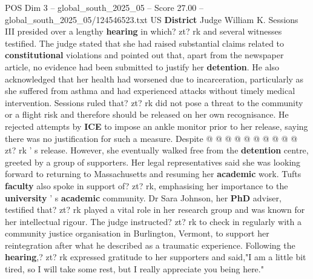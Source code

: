 \begin{textsample}{POS Dim 3 – global\_south\_2025\_05 – Score 27.00 – global\_south\_2025\_05/124546523.txt}
US \textbf{District} Judge William K.
Sessions III presided over a lengthy \textbf{hearing} in which? zt? rk and several witnesses testified.
The judge stated that she had raised substantial claims related to \textbf{constitutional} violations and pointed out that, apart from the newspaper article, no evidence had been submitted to justify her \textbf{detention}.
He also acknowledged that her health had worsened due to incarceration, particularly as she suffered from asthma and had experienced attacks without timely medical intervention.
Sessions ruled that? zt? rk did not pose a threat to the community or a flight risk and therefore should be released on her own recognisance.
He rejected attempts by \textbf{ICE} to impose an ankle monitor prior to her release, saying there was no justification for such a measure.
Despite @ @ @ @ @ @ @ @ @ @ zt? rk ' s release.
However, she eventually walked free from the \textbf{detention} centre, greeted by a group of supporters.
Her legal representatives said she was looking forward to returning to Massachusetts and resuming her \textbf{academic} work.
Tufts \textbf{faculty} also spoke in support of? zt? rk, emphasising her importance to the \textbf{university} ' s \textbf{academic} community.
Dr Sara Johnson, her \textbf{PhD} adviser, testified that? zt? rk played a vital role in her research group and was known for her intellectual rigour.
The judge instructed? zt? rk to check in regularly with a community justice organisation in Burlington, Vermont, to support her reintegration after what he described as a traumatic experience.
Following the \textbf{hearing},? zt? rk expressed gratitude to her supporters and said,"I am a little bit tired, so I will take some rest, but I really appreciate you being here."

\end{textsample}
